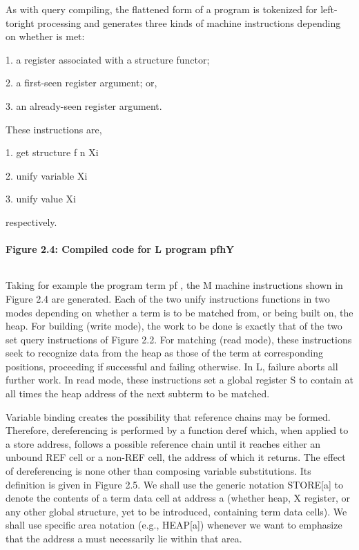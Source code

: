 As with query compiling, the flattened form of a program is tokenized for left-toright
processing and generates three kinds of machine instructions depending on
whether is met:

1. a register associated with a structure functor;

2. a first-seen register argument; or,

3. an already-seen register argument.

These instructions are,

1. get structure f n Xi

2. unify variable Xi

3. unify value Xi

respectively.

\paragraph{Figure 2.4: Compiled code for L program pfhY}
\begin{verbatim}

\end{verbatim}

Taking for example the program term pf
, the M
machine
instructions shown in Figure 2.4 are generated. Each of the two unify instructions
functions in two modes depending on whether a term is to be matched
from, or being built on, the heap. For building (write mode), the work to be
done is exactly that of the two set query instructions of Figure 2.2. For matching
(read mode), these instructions seek to recognize data from the heap as those
of the term at corresponding positions, proceeding if successful and failing otherwise.
In L,
failure aborts all further work. In read mode, these instructions set
a global register S to contain at all times the heap address of the next subterm to
be matched.

Variable binding creates the possibility that reference chains may be formed.
Therefore, dereferencing is performed by a function deref which, when applied
to a store address, follows a possible reference chain until it reaches either an unbound
REF cell or a non-REF cell, the address of which it returns. The effect of
dereferencing is none other than composing variable substitutions. Its definition
is given in Figure 2.5. We shall use the generic notation STORE[a] to denote the
contents of a term data cell at address a (whether heap, X register, or any other
global structure, yet to be introduced, containing term data cells). We shall use
specific area notation (e.g., HEAP[a]) whenever we want to emphasize that the
address a must necessarily lie within that area.

